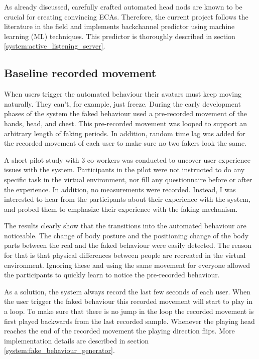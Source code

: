 \documentclass[]{simple-thesis}
\begin{document}
As already discussed, carefully crafted automated head nods are known to be crucial for creating convincing ECAs.
Therefore, the current project follows the literature in the field and implements backchannel predictor using machine learning (ML) techniques.
This predictor is thoroughly described in section \ref{system:active_listening_server}.

\subsection{Baseline recorded movement}

When users trigger the automated behaviour their avatars must keep moving naturally.
They can't, for example, just freeze.
During the early development phases of the system the faked behaviour used a pre-recorded movement of the hands, head, and chest.
This pre-recorded movement was looped to support an arbitrary length of faking periods.
In addition, random time lag was added for the recorded movement of each user to make sure no two fakers look the same.

A short pilot study with 3 co-workers was conducted to uncover user experience issues with the system.
Participants in the pilot were not instructed to do any specific task in the virtual environment, nor fill any questionnaire before or after the experience.
In addition, no measurements were recorded.
Instead, I was interested to hear from the participants about their experience with the system, and probed them to emphasize their experience with the faking mechanism.

The results clearly show that the transitions into the automated behaviour are noticeable.
The change of body posture and the positioning change of the body parts between the real and the faked behaviour were easily detected.
The reason for that is that physical differences between people are recreated in the virtual environment.
Ignoring these and using the same movement for everyone allowed the participants to quickly learn to notice the pre-recorded behaviour.

As a solution, the system always record the last few seconds of each user.
When the user trigger the faked behaviour this recorded movement will start to play in a loop.
To make sure that there is no jump in the loop the recorded movement is first played backwards from the last recorded sample.
Whenever the playing head reaches the end of the recorded movement the playing direction flips.
More implementation details are described in section \ref{system:fake_behaviour_generator}.
\end{document}
